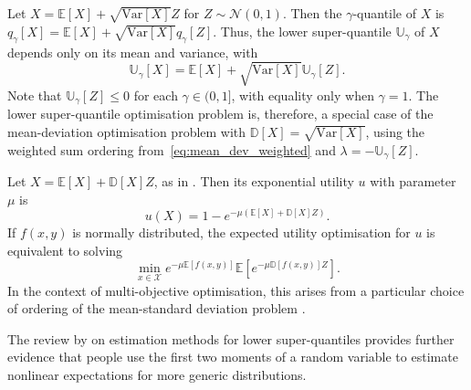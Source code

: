 \documentclass[main.tex]{subfiles}
\begin{document}
\begin{example}\label{ex:avar_normal}
  Let $X=\mathbb{E}[X]+ \sqrt{\mbox{Var}[X]} Z$ for $Z\sim\mathcal{N}(0,1)$.
  Then the $\gamma$-quantile of $X$ is
  $q_\gamma[X] = \mathbb{E}[X] + \sqrt{\mbox{Var}[X]} q_\gamma[Z]$.
  Thus, the lower super-quantile $\mathbb{U}_\gamma$ of $X$ depends only on
  its mean and variance, with
  \begin{equation}
    \mathbb{U}_\gamma[X] =  \mathbb{E}[X]
    + \sqrt{\mbox{Var}[X]} \mathbb{U}_\gamma[Z].
  \end{equation}
  Note that $\mathbb{U}_\gamma[Z]\leq 0$ for each $\gamma\in(0,1]$,
  with equality only when $\gamma=1$.
  The lower super-quantile optimisation problem is, therefore,
  a special case of the mean-deviation optimisation problem
  with $\mathbb{D}[X]=\sqrt{\mbox{Var}[X]}$,
  using the weighted sum ordering from~\eqref{eq:mean_dev_weighted} and
  $\lambda = -\mathbb{U}_\gamma[Z]$.
\end{example}

\begin{example}
  Let $X=\mathbb{E}[X]+ \mathbb{D}[X] Z$, as in .
  Then its exponential utility $u$ with parameter $\mu$
  is
  \begin{equation}
    u(X) = 1 - e^{-\mu (\mathbb{E}[X] +
      \mathbb{D}[X] Z)}.
  \end{equation}
  If $f(x,y)$ is normally distributed, the expected utility
  optimisation for $u$ is equivalent to solving
  \begin{equation}
    \min_{x\in\mathcal{X}}  e^{-\mu\mathbb{E}[f(x,y)]}
    \mathbb{E} \left[ e^{-\mu \mathbb{D}[f(x,y)] Z} \right].
  \end{equation}
  In the context of multi-objective optimisation, this arises from
  a particular choice of ordering of the mean-standard deviation
  problem \citep{marler2004survey}.
\end{example}

The review by \citet{nadarajah2014estimation} on estimation methods for
lower super-quantiles provides further evidence that people use
the first two moments of a random variable to estimate nonlinear
expectations for more generic distributions.
\end{document}
